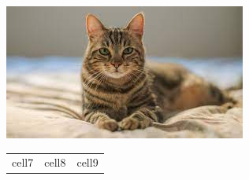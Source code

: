 \documentclass{report}
\begin{document}


    \includegraphics{../cat.jpg}

    \begin{tabular}{| c | c | c |}
    cell7 & cell8 & cell9    
   \end{tabular}
\end{document}
